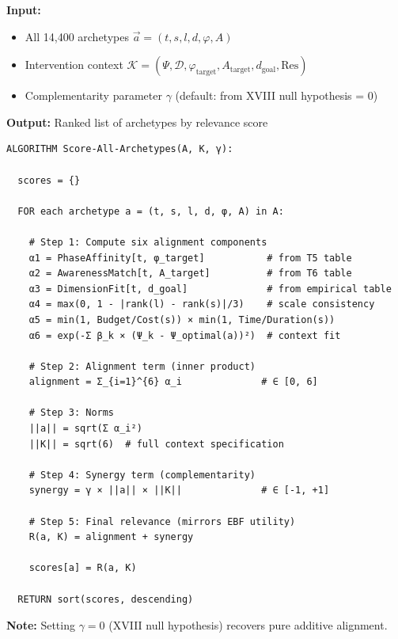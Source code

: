 \begin{tcolorbox}[colback=orange!5!white, colframe=orange!75!black,
    title=\textbf{Algorithm HHH-A2: Relevance Score via Inner Product}]

\textbf{Input:}
\begin{itemize}[nosep]
    \item All 14,400 archetypes $\vec{a} = (t, s, l, d, \varphi, A)$
    \item Intervention context $\mathcal{K} = (\Psi, \mathcal{D}, \varphi_{\text{target}}, A_{\text{target}}, d_{\text{goal}}, \text{Res})$
    \item Complementarity parameter $\gamma$ (default: from XVIII null hypothesis = 0)
\end{itemize}

\textbf{Output:} Ranked list of archetypes by relevance score

\begin{verbatim}
ALGORITHM Score-All-Archetypes(A, K, γ):

  scores = {}

  FOR each archetype a = (t, s, l, d, φ, A) in A:

    # Step 1: Compute six alignment components
    α1 = PhaseAffinity[t, φ_target]           # from T5 table
    α2 = AwarenessMatch[t, A_target]          # from T6 table
    α3 = DimensionFit[t, d_goal]              # from empirical table
    α4 = max(0, 1 - |rank(l) - rank(s)|/3)    # scale consistency
    α5 = min(1, Budget/Cost(s)) × min(1, Time/Duration(s))
    α6 = exp(-Σ β_k × (Ψ_k - Ψ_optimal(a))²)  # context fit

    # Step 2: Alignment term (inner product)
    alignment = Σ_{i=1}^{6} α_i              # ∈ [0, 6]

    # Step 3: Norms
    ||a|| = sqrt(Σ α_i²)
    ||K|| = sqrt(6)  # full context specification

    # Step 4: Synergy term (complementarity)
    synergy = γ × ||a|| × ||K||              # ∈ [-1, +1]

    # Step 5: Final relevance (mirrors EBF utility)
    R(a, K) = alignment + synergy

    scores[a] = R(a, K)

  RETURN sort(scores, descending)
\end{verbatim}

\textbf{Note:} Setting $\gamma = 0$ (XVIII null hypothesis) recovers pure additive alignment.

\end{tcolorbox}

